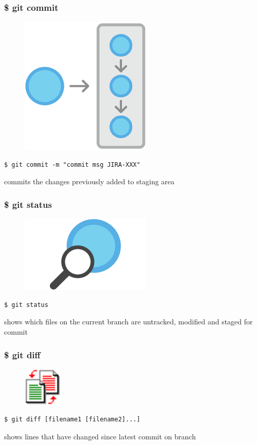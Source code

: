 \documentclass{beamer}
\begin{document}
\begin{frame}[fragile]
    \frametitle{\$ git commit}
    \begin{figure}[h!]
        \begin{center}
            \includegraphics[scale=0.7]{commit.png}
        \end{center}
    \end{figure}
    \begin{verbatim}
$ git commit -m "commit msg JIRA-XXX"
    \end{verbatim}
    commits the changes previously added to staging area
\end{frame}

\begin{frame}[fragile]
    \frametitle{\$ git status}
    \begin{figure}[h!]
        \begin{center}
            \includegraphics[scale=0.7]{status.png}
        \end{center}
    \end{figure}
    \begin{verbatim}
$ git status
    \end{verbatim}
    shows which files on the current branch are untracked, modified and staged for commit
\end{frame}

\begin{frame}[fragile]
    \frametitle{\$ git diff}
    \begin{figure}[h!]
        \begin{center}
            \includegraphics[scale=1.2]{diff.png}
        \end{center}
    \end{figure}
    \begin{verbatim}
$ git diff [filename1 [filename2]...]
    \end{verbatim}
    shows lines that have changed since latest commit on branch
\end{frame}
\end{document}

